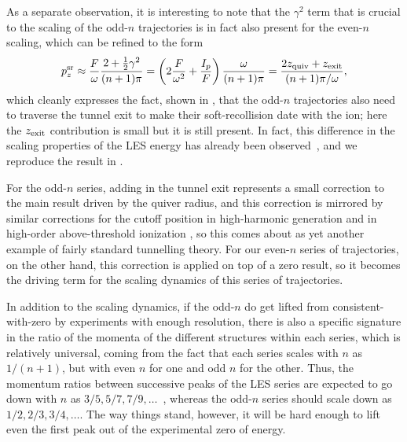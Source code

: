 As a separate observation, it is interesting to note that the $\gamma^2$ term that is crucial to the scaling of the odd-$n$ trajectories is in fact also present for the even-$n$ scaling, which can be refined to the form
\begin{equation}
p_z^{\mathrm{sr}} 
\approx \frac F\omega \frac{2+\frac12 \gamma^2}{(n+1)\pi}
= \left(2\frac{F}{\omega^2}+\frac{I_p}{F}\right) \frac{\omega}{(n+1)\pi}
= \frac{2z_\mathrm{quiv} + z_\mathrm{exit}}{(n+1)\pi/\omega},
\label{e6-even-n-scaling-with-zexit}
\end{equation}
which cleanly expresses the fact, shown in , that the odd-$n$ trajectories also need to traverse the tunnel exit to make their soft-recollision date with the ion; here the $z_\mathrm{exit}$ contribution is small but it is still present. In fact, this difference in the scaling properties of the LES energy has already been observed~\cite{murnane_TCSFA_tunnel_exit}, and we reproduce the result in .


For the odd-$n$ series, adding in the tunnel exit represents a small correction to the main result driven by the quiver radius, and this correction is mirrored by similar corrections for the cutoff position in high-harmonic generation \cite{LewensteinHHG} and in high-order above-threshold ionization \cite{ HATI_quantum_correction, HATI_quantum_correction_2, HATI_quantum_correction_3}, so this comes about as yet another example of fairly standard tunnelling theory. For our even-$n$ series of trajectories, on the other hand, this correction is applied on top of a zero result, so it becomes the driving term for the scaling dynamics of this series of trajectories.


In addition to the scaling dynamics, if the odd-$n$ do get lifted from consistent-with-zero by experiments with enough resolution, there is also a specific signature in the ratio of the momenta of the different structures within each series, which is relatively universal, coming from the fact that each series scales with $n$ as $1/(n+1)$, but with even $n$ for one and odd $n$ for the other. Thus, the momentum ratios between successive peaks of the LES series are expected to go down with $n$ as $3/5,5/7,7/9,\ldots$~\cite{Rost_PRL, Rost_JPhysB}, whereas the odd-$n$ series should scale down as $1/2,2/3,3/4,\ldots$. The way things stand, however, it will be hard enough to lift even the first peak out of the experimental zero of energy.




